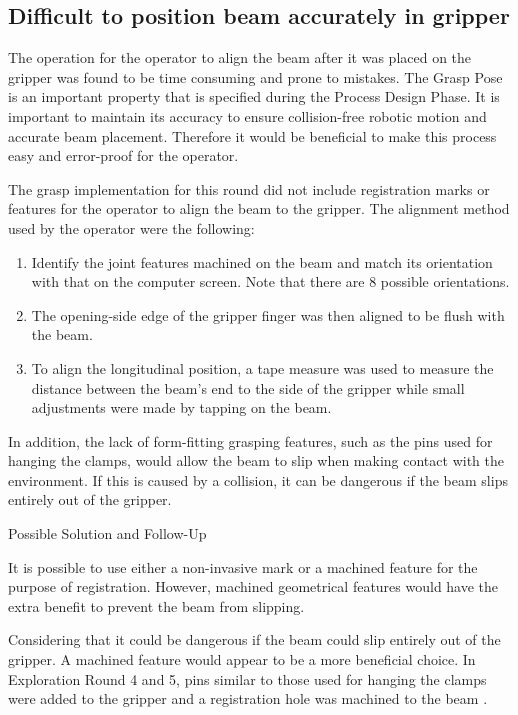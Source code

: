\subsection{Difficult to position beam accurately in gripper}
\label{subsection:exploration-2-difficult-to-position-beam-accurately-in-gripper}

The operation for the operator to align the beam after it was placed on the gripper was found to be time consuming and prone to mistakes. The Grasp Pose is an important property that is specified during the Process Design Phase. It is important to maintain its accuracy to ensure collision-free robotic motion and accurate beam placement. Therefore it would be beneficial to make this process easy and error-proof for the operator.

The grasp implementation for this round did not include registration marks or features for the operator to align the beam to the gripper. The alignment method used by the operator were the following:

\begin{enumerate}
    \item Identify the joint features machined on the beam and match its orientation with that on the computer screen. Note that there are 8 possible orientations.
    \item The opening-side edge of the gripper finger was then aligned to be flush with the beam.
    \item To align the longitudinal position, a tape measure was used to measure the distance between the beam’s end to the side of the gripper while small adjustments were made by tapping on the beam. 
\end{enumerate}

In addition, the lack of form-fitting grasping features, such as the pins used for hanging the clamps, would allow the beam to slip when making contact with the environment. If this is caused by a collision, it can be dangerous if the beam slips entirely out of the gripper.

Possible Solution and Follow-Up

It is possible to use either a non-invasive mark or a machined feature for the purpose of registration. However, machined geometrical features would have the extra benefit to prevent the beam from slipping. 

Considering that it could be dangerous if the beam could slip entirely out of the gripper. A machined feature would appear to be a more beneficial choice. In Exploration Round 4 and 5, pins similar to those used for hanging the clamps were added to the gripper and a registration hole was machined to the beam .

